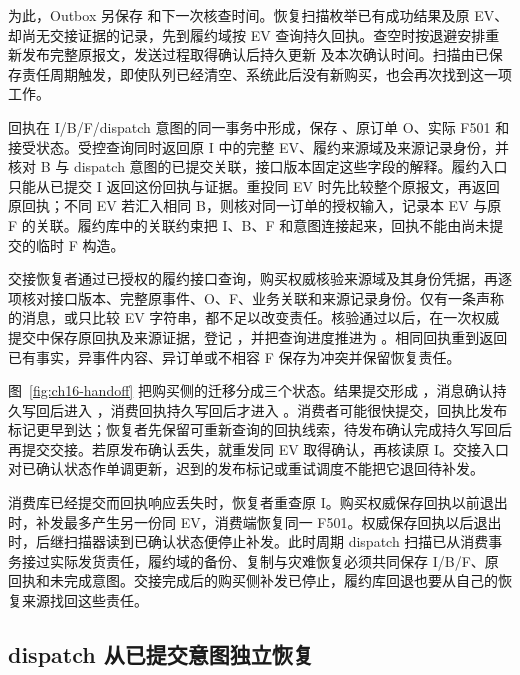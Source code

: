 为此，Outbox 另保存  和下一次核查时间。恢复扫描枚举已有成功结果及原 EV、却尚无交接证据的记录，先到履约域按 EV 查询持久回执。查空时按退避安排重新发布完整原报文，发送过程取得确认后持久更新  及本次确认时间。扫描由已保存责任周期触发，即使队列已经清空、系统此后没有新购买，也会再次找到这一项工作。

回执在 I/B/F/dispatch 意图的同一事务中形成，保存 、原订单 O、实际 F501 和接受状态。受控查询同时返回原 I 中的完整 EV、履约来源域及来源记录身份，并核对 B 与 dispatch 意图的已提交关联，接口版本固定这些字段的解释。履约入口只能从已提交 I 返回这份回执与证据。重投同 EV 时先比较整个原报文，再返回原回执；不同 EV 若汇入相同 B，则核对同一订单的授权输入，记录本 EV 与原 F 的关联。履约库中的关联约束把 I、B、F 和意图连接起来，回执不能由尚未提交的临时 F 构造。

交接恢复者通过已授权的履约接口查询，购买权威核验来源域及其身份凭据，再逐项核对接口版本、完整原事件、O、F、业务关联和来源记录身份。仅有一条声称  的消息，或只比较 EV 字符串，都不足以改变责任。核验通过以后，在一次权威提交中保存原回执及来源证据，登记 ，并把查询进度推进为 。相同回执重到返回已有事实，异事件内容、异订单或不相容 F 保存为冲突并保留恢复责任。


图~\ref{fig:ch16-handoff} 把购买侧的迁移分成三个状态。结果提交形成 ，消息确认持久写回后进入 ，消费回执持久写回后才进入 。消费者可能很快提交，回执比发布标记更早到达；恢复者先保留可重新查询的回执线索，待发布确认完成持久写回后再提交交接。若原发布确认丢失，就重发同 EV 取得确认，再核读原 I。交接入口对已确认状态作单调更新，迟到的发布标记或重试调度不能把它退回待补发。

消费库已经提交而回执响应丢失时，恢复者重查原 I。购买权威保存回执以前退出时，补发最多产生另一份同 EV，消费端恢复同一 F501。权威保存回执以后退出时，后继扫描器读到已确认状态便停止补发。此时周期 dispatch 扫描已从消费事务接过实际发货责任，履约域的备份、复制与灾难恢复必须共同保存 I/B/F、原回执和未完成意图。交接完成后的购买侧补发已停止，履约库回退也要从自己的恢复来源找回这些责任。

\subsection{dispatch 从已提交意图独立恢复}

